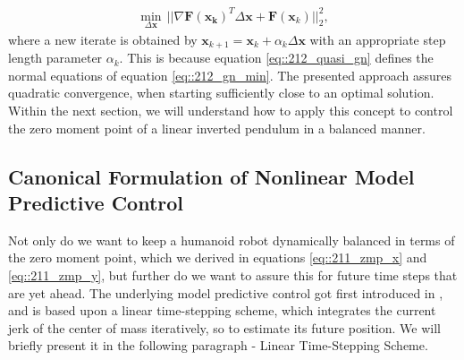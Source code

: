 \begin{align}
	\min_{\Delta\bm{x}}\,||\nabla\bm{F}(\bm{x_k})^T\Delta\bm{x}+\bm{F}(\bm{x}_k)||^2_2,
	\label{eq::212_gn_min}
\end{align}
where a new iterate is obtained by $\bm{x}_{k+1}=\bm{x}_k + \alpha_k\Delta \bm{x}$ with an appropriate step length parameter $\alpha_k$. This is because equation \ref{eq::212_quasi_gn} defines the normal equations of equation \ref{eq::212_gn_min}. The presented approach assures quadratic convergence, when starting sufficiently close to an optimal solution. Within the next section, we will understand how to apply this concept to control the zero moment point of a linear inverted pendulum in a balanced manner.
\FloatBarrier
\subsection{Canonical Formulation of Nonlinear Model Predictive Control}
Not only do we want to keep a humanoid robot dynamically balanced in terms of the zero moment point, which we derived in equations \ref{eq::211_zmp_x} and \ref{eq::211_zmp_y}, but further do we want to assure this for future time steps that are yet ahead. The underlying model predictive control got first introduced in \cite{kajita2003biped}, and is based upon a linear time-stepping scheme, which integrates the current jerk of the center of mass iteratively, so to estimate its future position. We will briefly present it in the following paragraph - Linear Time-Stepping Scheme.
\FloatBarrier
